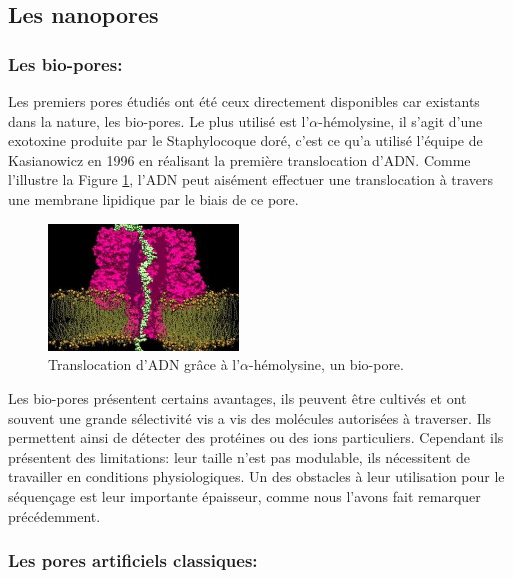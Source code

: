 \documentclass[a4paper,11pt]{article}
\begin{document}
 

\subsection*{Les nanopores}



\subsubsection*{Les bio-pores:}
Les premiers pores étudiés ont été ceux directement disponibles car existants dans la nature, les bio-pores. Le plus utilisé est l'$\alpha$-hémolysine, il s'agit d'une exotoxine produite par le Staphylocoque doré, c'est ce qu'a utilisé l'équipe de Kasianowicz \cite{kasianowicz} en 1996 en réalisant la première translocation d'ADN. Comme l'illustre la Figure \ref{biopore}, l'ADN peut aisément effectuer une translocation à travers une membrane lipidique par le biais de ce pore. \\

\begin{figure}[H]
\begin{center}
\includegraphics[width=0.45\textwidth]{biopore.jpg}

\caption{Translocation d'ADN grâce à l'$\alpha$-hémolysine, un bio-pore.}
\label{biopore}
\end{center}
\end{figure}

Les bio-pores présentent certains avantages, ils peuvent être cultivés et ont souvent une grande sélectivité vis a vis des molécules autorisées à traverser. Ils permettent ainsi de détecter des protéines ou des ions particuliers. Cependant ils présentent des limitations: leur taille n'est pas modulable, ils nécessitent de travailler en conditions physiologiques. Un des obstacles à leur utilisation pour le séquençage est leur importante épaisseur, comme nous l'avons fait remarquer précédemment.


\subsubsection*{Les pores artificiels classiques:}
\end{document}
